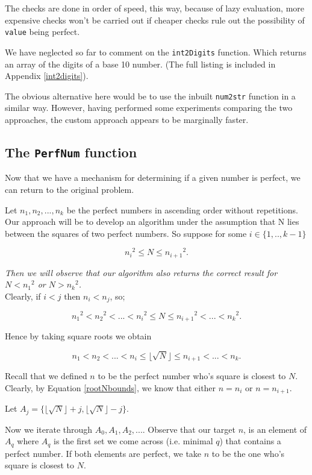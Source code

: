 \documentclass[10pt]{article}
\begin{document}
 The checks are done in order of speed, this way, because of lazy evaluation, more expensive checks won't be carried out if cheaper checks rule out the possibility of \texttt{value} being perfect.
 
We have neglected so far to comment on the \texttt{int2Digits} function. Which returns an array of the digits of a base 10 number. (The full listing is included in Appendix \ref{int2digits}).
 
 The obvious alternative here would be to use the inbuilt \texttt{num2str} function in a similar way. However, having performed some experiments comparing the two approaches, the custom approach appears to be marginally faster.
 
\subsection{The \texttt{PerfNum} function}

Now that we have a mechanism for determining if a given number is perfect, we can return to the original problem.

Let $n_1, n_2, ..., n_k$ be the perfect numbers in ascending order without repetitions. Our approach will be to develop an algorithm under the assumption that N lies between the squares of two perfect numbers. So suppose  for some $i \in \{ 1,..,k-1 \}$

$$ {n_i}^2 \leq N \leq {n_{i+1}}^2. $$

\emph{Then we will observe that our algorithm also returns the correct result for $N < {n_1}^2$ or $N > {n_k}^2$.} \\

Clearly, if $i<j \text{ then } n_i < n_j$, so;

$$ {n_1}^2 < {n_2}^2 < ... < {n_i} ^2 \leq N \leq {n_{i+1}}^2 < ... < {n_k}^2.$$

Hence by taking square roots we obtain

\begin{equation} \label{rootNbounds}
 n_1 < n_2 < ... <  n_i \leq \lfloor \sqrt{N} \rfloor \leq n_{i+1} < ... < n_k.
\end{equation}

Recall that we defined $n$ to be the perfect number who's square is closest to $N$. Clearly, by Equation \ref{rootNbounds}, we know that either $n = n_i$ or $n = n_{i+1}$. 

Let $A_j =\{  \lfloor \sqrt{N} \rfloor + j,  \lfloor \sqrt{N} \rfloor  - j \} .$

Now we iterate through $A_0, A_1, A_2,...$. Observe that our target $n$, is an element of $A_q$ where $A_q$ is the first set we come across (i.e. minimal $q$) that contains a perfect number. If both elements are perfect, we take $n$ to be the one who's square is closest to $N$.
\end{document}
